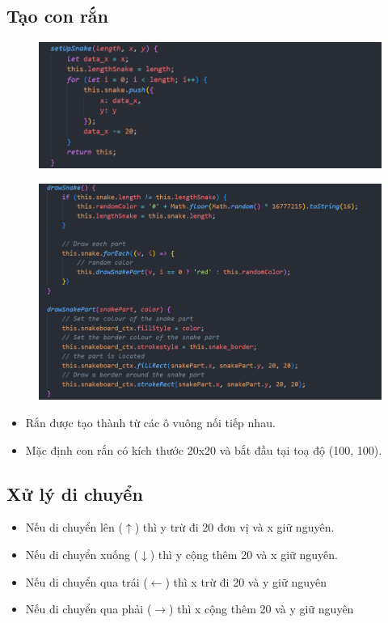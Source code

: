 \documentclass[../main-report.tex]{subfiles}
\begin{document}
\subsection{Tạo con rắn}
\begin{figure}[ht]
    \centering
    \includegraphics[scale=0.6]{hinh/snake1.png}
\end{figure}
\begin{figure}[ht]
    \centering
    \includegraphics[scale=0.6]{hinh/snake1_2.png}
\end{figure}
\begin{itemize}
    \item Rắn được tạo thành từ các ô vuông nối tiếp nhau.
    \item Mặc định con rắn có kích thước 20x20 và bắt đầu tại toạ độ (100, 100).
\end{itemize}
\subsection{Xử lý di chuyển}
\begin{itemize}
    \item Nếu di chuyển lên ($\uparrow$) thì y trừ đi 20 đơn vị và x giữ nguyên.
    \item Nếu di chuyển xuống ($\downarrow$) thì y cộng thêm 20 và x giữ nguyên.
    \item Nếu di chuyển qua trái ($\leftarrow$) thì x trừ đi 20 và y giữ nguyên
    \item Nếu di chuyển qua phải ($\rightarrow$) thì x cộng thêm 20 và y giữ nguyên
\end{itemize}
\end{document}
